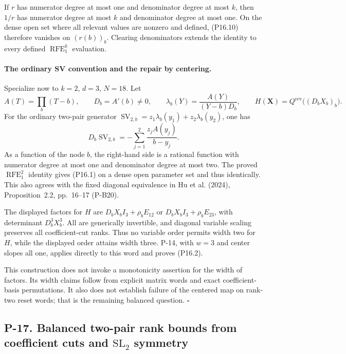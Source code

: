 If $r$ has numerator degree at most one and denominator degree at
most $k$, then $1/r$ has numerator degree at most $k$ and denominator
degree at most one. On the dense open set where all relevant values
are nonzero and defined, (P16.10) therefore vanishes on $(r(b))_b$.
Clearing denominators extends the identity to every defined
$\operatorname{RFE}_{1}^{k}$ evaluation.

\paragraph{The ordinary SV convention and the repair by centering.}
Specialize now to $k=2$, $d=3$, $N=18$. Let
\[
 A(T)=\prod_b(T-b),\qquad D_b=A'(b)\ne0,
 \qquad \lambda_b(Y)=\frac{A(Y)}{(Y-b)D_b},
 \qquad H(\mathbf X)=Q^{\mathrm{rev}}\bigl((D_bX_b)_b\bigr).
 \tag{P16.11}
\]
For the ordinary two-pair generator
$\operatorname{SV}_{2,b}=z_1\lambda_b(y_1)+z_2\lambda_b(y_2)$, one has
\[
 D_b\operatorname{SV}_{2,b}
   =-\sum_{j=1}^{2}\frac{z_jA(y_j)}{b-y_j}.
 \tag{P16.12}
\]
As a function of the node $b$, the right-hand side is a rational
function with numerator degree at most one and denominator degree
at most two. The proved $\operatorname{RFE}_{1}^{2}$ identity gives
(P16.1) on a dense open parameter set and thus identically. This
also agrees with the fixed diagonal equivalence in Hu et al. (2024),
Proposition~2.2, pp.~16--17 (P-B20).

The displayed factors for $H$ are
$D_bX_bI_3+\rho_bE_{12}$ or $D_bX_bI_3+\rho_bE_{23}$, with determinant
$D_b^3X_b^3$. All are generically invertible, and diagonal variable
scaling preserves all coefficient-cut ranks. Thus no variable order permits width two for $H$, while the displayed
order attains width three. P-14, with $w=3$ and center slopes
all one, applies directly to this word and proves (P16.2).

This construction does not invoke a monotonicity assertion for the
width of factors. Its width claims follow from explicit matrix words
and exact coefficient-basis permutations. It also does not establish
failure of the centered map on rank-two reset words; that is the
remaining balanced question.
\hfill$\square$



\subsection{P-17. Balanced two-pair rank bounds from coefficient cuts and $\mathrm{SL}_2$ symmetry}
\label{P-17}

